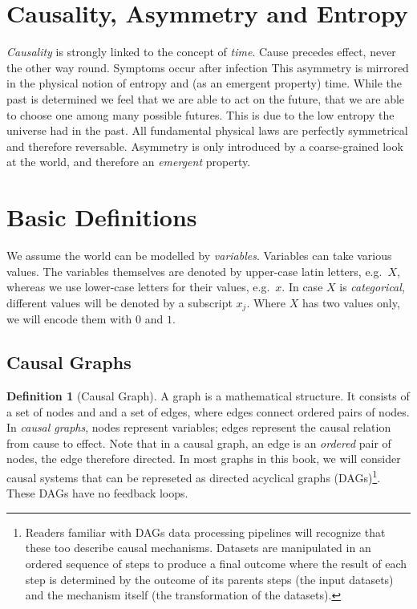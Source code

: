 \documentclass[
]{book}
\theoremstyle{definition}
\newtheorem{definition}{Definition}[chapter]
\theoremstyle{definition}
\theoremstyle{definition}
\theoremstyle{remark}
\begin{document}
\hypertarget{causality-asymmetry-and-entropy}{%
\section{Causality, Asymmetry and Entropy}\label{causality-asymmetry-and-entropy}}

\emph{Causality} is strongly linked to the concept of \emph{time}. Cause precedes effect, never the other way round. Symptoms occur after infection
This asymmetry is mirrored in the physical notion of entropy and (as an emergent property) time.
While the past is determined we feel that we are able to act on the future, that we are able to choose one among many possible futures. This is due to the low entropy the universe had in the past.
All fundamental physical laws are perfectly symmetrical and therefore reversable. Asymmetry is only introduced by a coarse-grained look at the world, and therefore an \emph{emergent} property.

\hypertarget{basic-definitions}{%
\section{Basic Definitions}\label{basic-definitions}}

We assume the world can be modelled by \emph{variables}. Variables can take various values. The variables themselves are denoted by upper-case latin letters, e.g.~\(X\), whereas we use lower-case letters for their values, e.g.~\(x\). In case \(X\) is \emph{categorical}, different values will be denoted by a subscript \(x_j\). Where \(X\) has two values only, we will encode them with \(0\) and \(1\).

\hypertarget{causal-graphs}{%
\subsection{Causal Graphs}\label{causal-graphs}}

\begin{definition}[Causal Graph]
\protect\hypertarget{def:graphs}{}{\label{def:graphs} {} }A graph is a mathematical structure. It consists of a set of nodes and and a set of edges, where edges connect ordered pairs of nodes. In \emph{causal graphs}, nodes represent variables; edges represent the causal relation from cause to effect. Note that in a causal graph, an edge is an \emph{ordered} pair of nodes, the edge therefore directed. In most graphs in this book, we will consider causal systems that can be represeted as directed acyclical graphs (DAGs)\footnote{Readers familiar with DAGs data processing pipelines will recognize that these too describe causal mechanisms. Datasets are manipulated in an ordered sequence of steps to produce a final outcome where the result of each step is determined by the outcome of its parents steps (the input datasets) and the mechanism itself (the transformation of the datasets).}. These DAGs have no feedback loops.
\end{definition}
\end{document}
